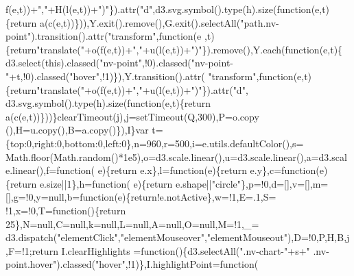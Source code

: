 \begin{DoxyCode}
      f(e,t))+\textcolor{stringliteral}{","}+H(l(e,t))+\textcolor{stringliteral}{")"}\}).attr(\textcolor{stringliteral}{"d"},d3.svg.symbol().type(h).size(\textcolor{keyword}{function}(e,t)\{\textcolor{keywordflow}{return} 
      a(c(e,t))\})),Y.exit().remove(),G.exit().selectAll(\textcolor{stringliteral}{"path.nv-point"}).transition().attr(\textcolor{stringliteral}{"transform"},\textcolor{keyword}{function}(e
      ,t)\{\textcolor{keywordflow}{return}\textcolor{stringliteral}{"translate("}+o(f(e,t))+\textcolor{stringliteral}{","}+u(l(e,t))+\textcolor{stringliteral}{")"}\}).\textcolor{keyword}{remove}(),Y.each(\textcolor{keyword}{function}(e,t)\{
      d3.select(\textcolor{keyword}{this}).classed(\textcolor{stringliteral}{"nv-point"},!0).classed(\textcolor{stringliteral}{"nv-point-"}+t,!0).classed(\textcolor{stringliteral}{"hover"},!1)\}),Y.transition().attr(\textcolor{stringliteral}{
      "transform"},\textcolor{keyword}{function}(e,t)\{\textcolor{keywordflow}{return}\textcolor{stringliteral}{"translate("}+o(f(e,t))+\textcolor{stringliteral}{","}+u(l(e,t))+\textcolor{stringliteral}{")"}\}).attr(\textcolor{stringliteral}{"d"},
      d3.svg.symbol().type(h).size(\textcolor{keyword}{function}(e,t)\{\textcolor{keywordflow}{return} a(c(e,t))\}))\}clearTimeout(j),j=setTimeout(Q,300),P=o.copy
      (),H=u.copy(),B=a.copy()\}),I\}var t=\{top:0,right:0,bottom:0,left:0\},n=960,r=500,i=e.utils.defaultColor(),s=
      Math.floor(Math.random()*1e5),o=d3.scale.linear(),u=d3.scale.linear(),a=d3.scale.linear(),f=\textcolor{keyword}{function}(
      e)\{\textcolor{keywordflow}{return} e.x\},l=\textcolor{keyword}{function}(e)\{\textcolor{keywordflow}{return} e.y\},c=\textcolor{keyword}{function}(e)\{\textcolor{keywordflow}{return} e.size||1\},h=\textcolor{keyword}{function}(
      e)\{\textcolor{keywordflow}{return} e.shape||\textcolor{stringliteral}{"circle"}\},p=!0,d=[],v=[],m=[],g=!0,y=null,b=\textcolor{keyword}{function}(e)\{\textcolor{keywordflow}{return}!e.notActive\},w=!1,E=.1,S=
      !1,x=!0,T=\textcolor{keyword}{function}()\{\textcolor{keywordflow}{return} 25\},N=null,C=null,k=null,L=null,A=null,O=null,M=!1,\_=
      d3.dispatch(\textcolor{stringliteral}{"elementClick"},\textcolor{stringliteral}{"elementMouseover"},\textcolor{stringliteral}{"elementMouseout"}),D=!0,P,H,B,j,F=!1;\textcolor{keywordflow}{return} I.clearHighlights
      =\textcolor{keyword}{function}()\{d3.selectAll(\textcolor{stringliteral}{".nv-chart-"}+s+\textcolor{stringliteral}{" .nv-point.hover"}).classed(\textcolor{stringliteral}{"hover"},!1)\},I.highlightPoint=\textcolor{keyword}{function}(

\end{DoxyCode}
